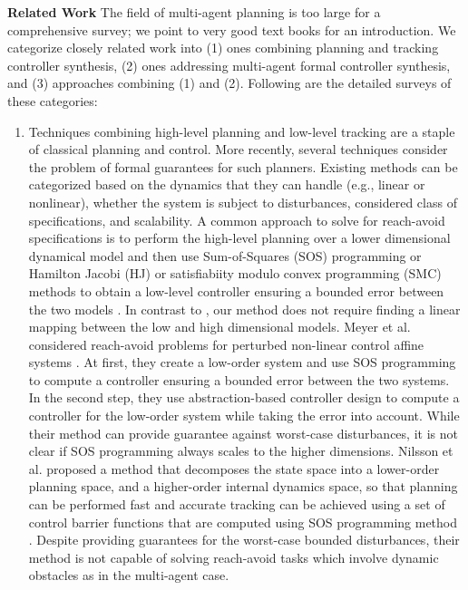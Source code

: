 \smallskip
\noindent\textbf{Related Work}
%
The field of multi-agent planning is too large for a comprehensive survey; we point to very good text books
\cite{LaValle2006,LaValle1998planning,choset2005principles,russel2010AIplanning} for an introduction.
We categorize closely related work into (1) ones combining planning and tracking controller synthesis, 
(2) ones addressing multi-agent formal controller synthesis, and 
(3) approaches combining (1) and (2).
Following are the detailed surveys of these categories:

\begin{enumerate}[(1)]
	\item Techniques combining high-level planning and low-level tracking are a staple of classical planning and control. 
More recently, several techniques consider the problem of formal guarantees for such planners.
Existing methods can be categorized based on the dynamics that they can handle (e.g., linear or nonlinear),
whether the system is subject to disturbances, considered class of specifications, and scalability. 
A common approach to solve for reach-avoid specifications is to perform the high-level planning over a lower dimensional dynamical model and then use
Sum-of-Squares (SOS) programming or Hamilton Jacobi (HJ) or satisfiabiity modulo convex programming (SMC) methods to obtain a low-level controller ensuring a bounded error between the 
two models \cite{herbert2017fastrack,DBLP:journals/corr/abs-1911-09773,singh2018robust,Nilsson:2018}. 
In contrast to \cite{herbert2017fastrack,singh2018robust}, our method does not require finding 
a linear mapping between the low and high dimensional models. Meyer et al. considered reach-avoid problems for perturbed non-linear control affine systems \cite{DBLP:journals/corr/abs-1911-09773}. At first, they create a low-order system and use SOS programming to compute a controller ensuring a bounded error between the two systems. In the second step, they use abstraction-based controller design to compute a controller for the low-order system while taking the error into account. While their method can provide guarantee against worst-case disturbances, it is not clear if SOS programming always scales to the higher dimensions. 
Nilsson et al.  proposed a method that decomposes the state space into a lower-order planning space, and a higher-order internal dynamics space, so that planning can be performed fast and accurate tracking can be achieved using a set of control barrier functions that are computed using SOS programming method \cite{Nilsson:2018}. Despite providing guarantees for the worst-case bounded disturbances, their method is not capable of solving reach-avoid tasks which involve dynamic obstacles as in the multi-agent case.

\end{enumerate}
